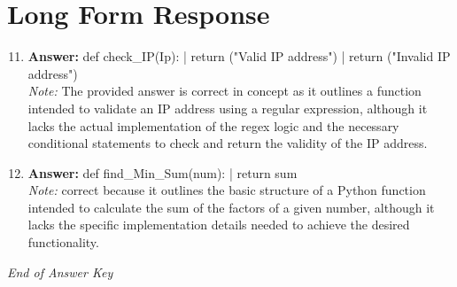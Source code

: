 \documentclass[12pt]{article}
\begin{document}
\section*{Long Form Response}
\begin{enumerate}[label=\arabic*.]
\setcounter{enumi}{10}
\item \textbf{Answer:} def check\_IP(Ip): | return ("Valid IP address") | return ("Invalid IP address")
\\ \textit{Note:} The provided answer is correct in concept as it outlines a function intended to validate an IP address using a regular expression, although it lacks the actual implementation of the regex logic and the necessary conditional statements to check and return the validity of the IP address.
\item \textbf{Answer:} def find\_Min\_Sum(num): | return sum
\\ \textit{Note:} correct because it outlines the basic structure of a Python function intended to calculate the sum of the factors of a given number, although it lacks the specific implementation details needed to achieve the desired functionality.
\end{enumerate}

\vfill
\noindent\textit{End of Answer Key}
\end{document}
